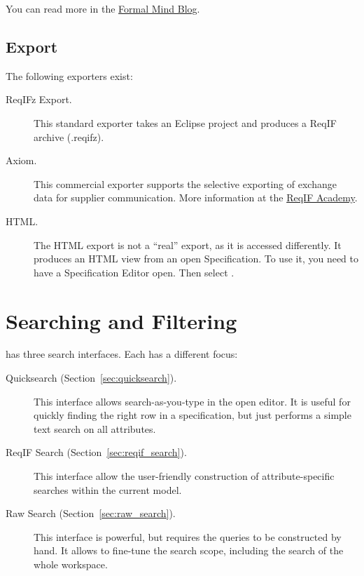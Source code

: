 You can read more in the \href{http://formalmind.com/blog/new-stuff-new-committer-new-product-new-importer-new-release}{Formal Mind Blog}.

\subsection{Export}
\label{sec:export}

The following exporters exist:

\begin{description}
\item[ReqIFz Export.] This standard exporter takes an Eclipse project and produces a ReqIF archive (.reqifz).

\item[Axiom.] This commercial exporter supports the selective exporting of exchange data for supplier communication.  More information at the \href{https://reqif.academy}{ReqIF Academy}.

\item[HTML.] The HTML export is not a ``real'' export, as it is accessed differently.  It produces an HTML view from an open Specification.  To use it, you need to have a Specification Editor open.  Then select .
\end{description}

\section{Searching and Filtering}
\label{sec:search}

\pror{} has three search interfaces.  Each has a different focus:

\begin{description}
\item[Quicksearch (Section~\ref{sec:quicksearch}).] This interface allows search-as-you-type in the open editor.  It is useful for quickly finding the right row in a specification, but just performs a simple text search on all attributes.
\item[ReqIF Search (Section~\ref{sec:reqif_search}).] This interface allow the user-friendly construction of attribute-specific searches within the current model.
\item[Raw Search (Section~\ref{sec:raw_search}).] This interface is powerful, but requires the queries to be constructed by hand.  It allows to fine-tune the search scope, including the search of the whole workspace.
\end{description}

